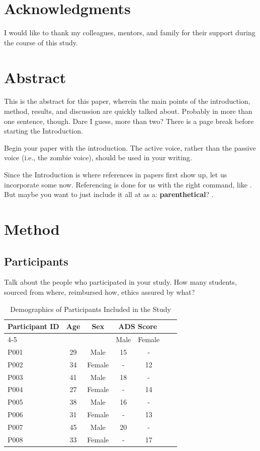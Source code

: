 \documentclass[stu,12pt,floatsintext,a4paper]{apa7}
\begin{document}
\section*{Acknowledgments}
I would like to thank my colleagues, mentors, and family for their support during the course of this study.
\newpage
\section*{Abstract}{This is the abstract for this paper, wherein the main points of the introduction, method, results, and discussion are quickly talked about. Probably in more than one sentence, though. Dare I guess, more than two? There is a page break before starting the Introduction.}
\newpage

Begin your paper with the introduction. The active voice, rather than the passive voice (i.e., the zombie voice), should be used in your writing.

Since the Introduction is where references in papers first show up, let us incorporate some now. Referencing  is done  for us with the right command, like  \textcite{Sample2024}. But maybe you want to just include it all at as a: \textbf{parenthetical}? \parencite{Fink2021, Contributor2023, Sample2024}. 

\section{Method}


\subsection{Participants}

Talk about the people who participated in your study. How many students, sourced from where, reimbursed how, ethics assured by what?

\begin{table}[ht]
\centering
\caption{Demographics of Participants Included in the Study}
\begin{tabular}{lcccccc}
\toprule
\multirow{2}{*}{Participant ID} & \multirow{2}{*}{Age} & \multirow{2}{*}{Sex} & \multicolumn{2}{c}{ADS Score} \\
\cline{4-5}
 & & & Male & Female \\
\midrule
P001 & 29 & Male & 15 & - \\
P002 & 34 & Female & - & 12 \\
P003 & 41 & Male & 18 & - \\
P004 & 27 & Female & - & 14 \\
P005 & 38 & Male & 16 & - \\
P006 & 31 & Female & - & 13 \\
P007 & 45 & Male & 20 & - \\
P008 & 33 & Female & - & 17 \\
\bottomrule
\end{tabular}
\label{tab:demographics}
\end{table}
\end{document}
